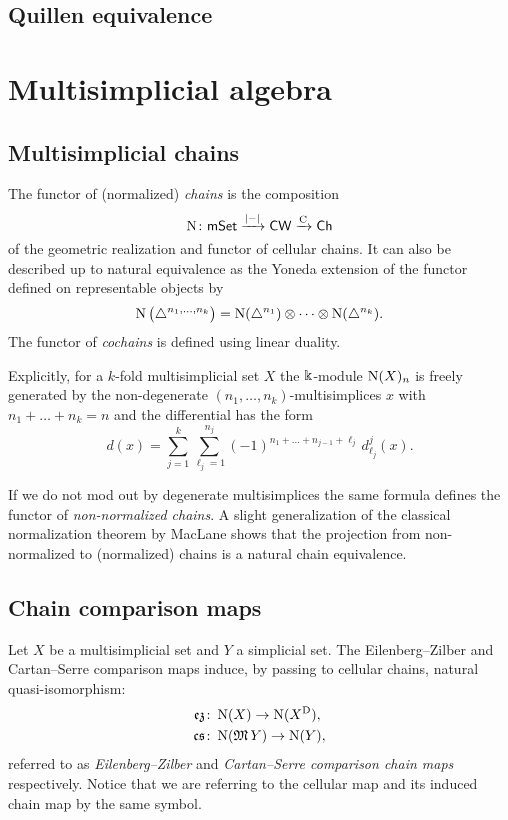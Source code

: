 \subsection{Quillen equivalence}


\section{Multisimplicial algebra}


\subsection{Multisimplicial chains}

The functor of (normalized) \textit{chains} is the composition
\[
\operatorname{N} \colon \mathsf{mSet} \xrightarrow{\lvert-\rvert} \mathsf{CW} \xrightarrow{\operatorname{C}} \mathsf{Ch}
\]
of the geometric realization and functor of cellular chains.
It can also be described up to natural equivalence as the Yoneda extension of the functor defined on representable objects by
\[
\operatorname{N} \big( \triangle^{n_1, \dots, n_k} \big) =
\operatorname{N}(\triangle^{n_1}) \otimes \dotsb \otimes \operatorname{N}(\triangle^{n_k}).
\]
The functor of \textit{cochains} is defined using linear duality.

Explicitly, for a $k$-fold multisimplicial set $X$ the $\Bbbk$-module $\operatorname{N}(X)_n$ is freely generated by the non-degenerate $(n_1, \dots, n_k)$-multisimplices $x$ with $n_1 + \dots + n_k = n$ and the differential has the form
\[
d(x) = \sum_{j=1}^k \sum_{\ell_j=1}^{n_j}
(-1)^{n_{1}+\dots+n_{j-1}+\ell_j} \, d^j_{\ell_j}(x).
\]

If we do not mod out by degenerate multisimplices the same formula defines the functor of \textit{non-normalized chains}.
A slight generalization of the classical normalization theorem by MacLane \cite{MacLane} shows that the projection from non-normalized to (normalized) chains is a natural chain equivalence.

\subsection{Chain comparison maps} \label{ss:comparison chain maps}

Let $X$ be a multisimplicial set and $Y$ a simplicial set.
The Eilenberg--Zilber and Cartan--Serre comparison maps induce, by passing to cellular chains, natural quasi-isomorphism:
\[
\begin{split}
\operatorname{\mathfrak{ez}} &\colon \operatorname{N}(X) \to \operatorname{N}(X^{\mathrm{D}}), \\
\operatorname{\mathfrak{cs}} &\colon \operatorname{N}(\operatorname{\mathfrak{M}} Y) \to \operatorname{N}(Y), \\
\end{split}
\]
referred to as \textit{Eilenberg--Zilber} and \textit{Cartan--Serre comparison chain maps} respectively.
Notice that we are referring to the cellular map and its induced chain map by the same symbol.

